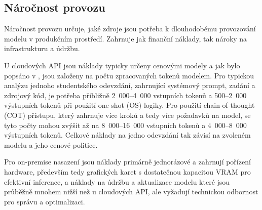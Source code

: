 \subsection{Náročnost provozu}
\label{subsec:criteria-operational}

Náročnost provozu určuje, jaké zdroje jsou potřeba k dlouhodobému provozování modelu v produkčním prostředí.
Zahrnuje jak finanční náklady, tak nároky na infrastrukturu a údržbu.

U cloudových API jsou náklady typicky určeny cenovými modely a jak bylo popsáno v , jsou založeny na počtu zpracovaných tokenů modelem.
Pro typickou analýzu jednoho studentského odevzdání, zahrnující systémový prompt, zadání a zdrojový kód, je potřeba přibližně 2~000--4~000 vstupních tokenů a 500--2~000 výstupních tokenů při použití one-shot (OS) logiky.
Pro použití chain-of-thought (COT) přístupu, který zahrnuje více kroků a tedy více požadavků na model, se tyto počty mohou zvýšit až na 8~000--16~000 vstupních tokenů a 4~000--8~000 výstupních tokenů.
Celkové náklady na jedno odevzdání tak závisí na zvoleném modelu a jeho cenové politice.

Pro on-premise nasazení jsou náklady primárně jednorázové a zahrnují pořízení hardware, především tedy grafických karet s dostatečnou kapacitou VRAM pro efektivní inference, a náklady na údržbu a aktualizace modelu které jsou průběžně mnohem nižší než u cloudových API, ale vyžadují technickou odbornost pro správu a optimalizaci.

\endinput